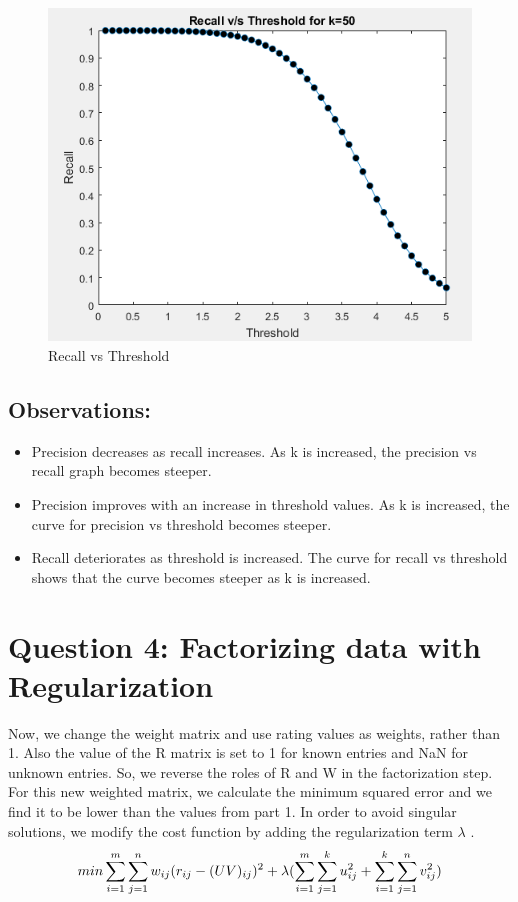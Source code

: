 \documentclass[12pt, onecolumn]{IEEEtran}
\begin{document}
\begin{figure}[h]
\centering
\captionsetup{justification=centering}
\includegraphics[scale=0.59]{Graphs/3-9}
\caption{Recall vs Threshold}
\end{figure}
%
%
\subsection*{Observations:}
\begin{itemize}
\item Precision decreases as recall increases. As k is increased, the precision vs recall graph becomes steeper.
\item Precision improves with an increase in threshold values. As k is increased, the curve for precision vs threshold becomes steeper.
\item Recall deteriorates as threshold is increased. The curve for recall vs threshold shows that the curve becomes steeper as k is increased.
\end{itemize}
\newpage
\section*{Question 4: Factorizing data with Regularization}
	Now, we change the weight matrix and use rating values as weights, rather than 1. Also the value of the R matrix is set to 1 for known entries and NaN for unknown entries. So, we reverse the roles of R and W in the factorization step. For this new weighted matrix, we calculate the minimum squared error and we find it to be lower than the values from part 1. In order to avoid singular solutions, we modify the cost function by adding the regularization term $\lambda$ . 
	\begin{equation}
	\centering
	min \sum\limits_{i=1}^m \sum\limits_{j=1}^n  w_{ij}(r_{ij} - (UV)_{ij})^2 + \lambda ( \sum\limits_{i=1}^m \sum\limits_{j=1}^k u_{ij}^2 + \sum\limits_{i=1}^k \sum\limits_{j=1}^n v_{ij}^2)
	\end{equation}
	
\end{document}
